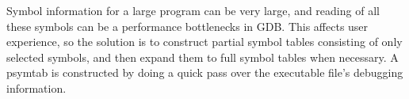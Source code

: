 Symbol information for a large program can be very large, and reading of all
these symbols can be a performance bottlenecks in GDB. This affects user
experience, so the solution is to construct partial symbol tables consisting of
only selected symbols, and then expand them to full symbol tables when
necessary.
A psymtab is constructed by doing a quick pass over the executable file's
debugging information.
